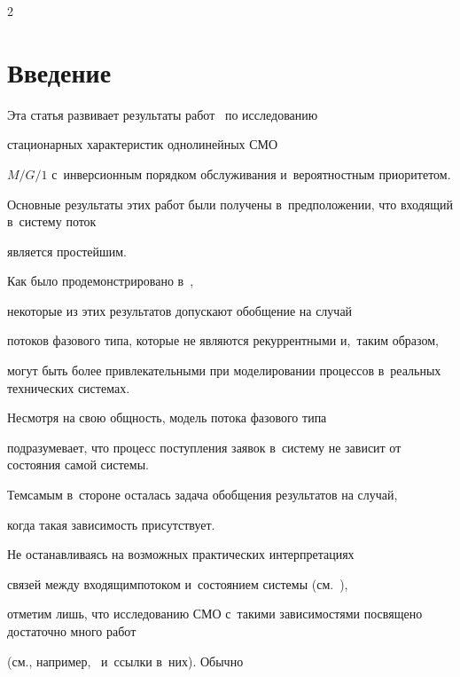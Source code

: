 \begin{multicols}{2}





\label{st\stat}





\section{Введение}





Эта статья развивает результаты работ~\cite{n0,n1,n2,n3,n4,n5} по исследованию


стационарных характеристик однолинейных СМО


$M/G/1$ с~инверсионным порядком обслуживания и~вероятностным приоритетом.


Основные результаты этих работ были получены в~предположении, что входящий в~систему поток


является простейшим. 





Как было продемонстрировано в~\cite{nm1},


некоторые из этих результатов допускают обобщение на случай


потоков фазового типа, которые не являются рекуррентными и,~таким образом,


могут быть более привлекательными при моделировании процессов в~реальных технических системах.


Несмотря на свою общность, модель потока фазового типа


подразумевает, что процесс поступления заявок в~сис\-те\-му не зависит от состояния самой системы.


Тем\linebreak самым в~стороне осталась задача обобщения результатов на случай,


когда такая зависимость присутствует.


Не останавливаясь на возможных практических интерпретациях


связей между входящим\linebreak потоком и~состоянием системы (см.~\cite{gg2}),


 отметим лишь, что исследованию СМО с~такими зависимостями посвящено достаточно много работ


(см., например,~\cite{gg1,gg3,gg4,gg5} и~ссылки в~них). Обычно



\end{multicols}
